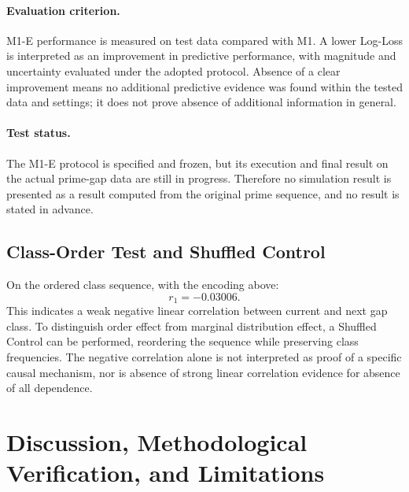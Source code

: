 \documentclass[12pt,a4paper]{article}
\begin{document}
\paragraph{Evaluation criterion.}
M1-E performance is measured on test data compared with M1. A lower Log-Loss is interpreted as an improvement in predictive performance, with magnitude and uncertainty evaluated under the adopted protocol. Absence of a clear improvement means no additional predictive evidence was found within the tested data and settings; it does not prove absence of additional information in general.
\paragraph{Test status.}
The M1-E protocol is specified and frozen, but its execution and final result on the actual prime-gap data are still in progress. Therefore no simulation result is presented as a result computed from the original prime sequence, and no result is stated in advance.
\subsection{Class-Order Test and Shuffled Control}
On the ordered class sequence, with the encoding above:
\[
r_1=-0.03006.
\]
This indicates a weak negative linear correlation between current and next gap class. To distinguish order effect from marginal distribution effect, a Shuffled Control can be performed, reordering the sequence while preserving class frequencies. The negative correlation alone is not interpreted as proof of a specific causal mechanism, nor is absence of strong linear correlation evidence for absence of all dependence.
\section{Discussion, Methodological Verification, and Limitations}
\end{document}
